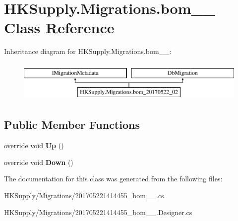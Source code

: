 \hypertarget{class_h_k_supply_1_1_migrations_1_1bom__20170522__02}{}\section{H\+K\+Supply.\+Migrations.\+bom\+\_\+\_ Class Reference}
\label{class_h_k_supply_1_1_migrations_1_1bom__20170522__02}
Inheritance diagram for H\+K\+Supply.\+Migrations.\+bom\+\_\+\_\+:\begin{figure}[H]
\begin{center}
\leavevmode
\includegraphics[height=2.000000cm]{class_h_k_supply_1_1_migrations_1_1bom__20170522__02}
\end{center}
\end{figure}
\subsection*{Public Member Functions}
\begin{DoxyCompactItemize}
\item 
\mbox{\label{class_h_k_supply_1_1_migrations_1_1bom__20170522__02_a69d6d0b4d2961229fedceaab97944437}} 
override void {\bfseries Up} ()
\item 
\mbox{\label{class_h_k_supply_1_1_migrations_1_1bom__20170522__02_a24e6f0e3a090b41267867527e76cf332}} 
override void {\bfseries Down} ()
\end{DoxyCompactItemize}


The documentation for this class was generated from the following files\+:\begin{DoxyCompactItemize}
\item 
H\+K\+Supply/\+Migrations/201705221414455\+\_\+bom\+\_\+\_.\+cs\item 
H\+K\+Supply/\+Migrations/201705221414455\+\_\+bom\+\_\+\_.\+Designer.\+cs\end{DoxyCompactItemize}
